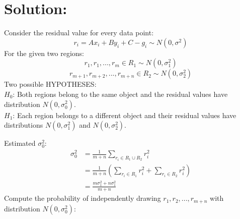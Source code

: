 \documentclass[12pt]{article}
\begin{document}
\section{Solution:}
Consider the residual value for every data point:
\begin{equation*}
r_i = Ax_i + By_i+C - g_i  \sim N(0, \sigma^2)
\end{equation*}
For the given two regions:
\begin{equation*}
r_{1}, r_{1}, ..., r_{m} \in R_1 \sim N(0, \sigma_1^2)
\end{equation*}
\begin{equation*}
r_{m+1}, r_{m+2}, ..., r_{m+n} \in R_2\sim N(0, \sigma_2^2)
\end{equation*}
Two possible HYPOTHESES:\\
\textbf{$H_0$}: Both regions belong to the same object and the residual values have distribution $N(0, \sigma_0^2)$.\\
\textbf{$H_1$}: Each region belongs to a different object and their residual values have distributions $N(0, \sigma_1^2)$ and $N(0, \sigma_2^2)$.\\

\vfill
\clearpage

\noindent Estimated $\sigma_0^2$:
\begin{equation*}
\begin{aligned}
\sigma_0^2&=\frac{1}{m+n}\sum_{r_i\in R_1\cup R_2}r_i^2\\
& = \frac{1}{m+n}\left (\sum_{r_i\in R_1}r_i^2+\sum_{r_i\in R_2}r_i^2 \right)\\
&=\frac{m\sigma_1^2+n\sigma_1^2}{m+n}
\end{aligned}
\end{equation*}
Compute the probability of independently drawing $r_1, r_2, ..., r_{m+n}$ with distribution $N(0, \sigma_0^2)$:
\end{document}
